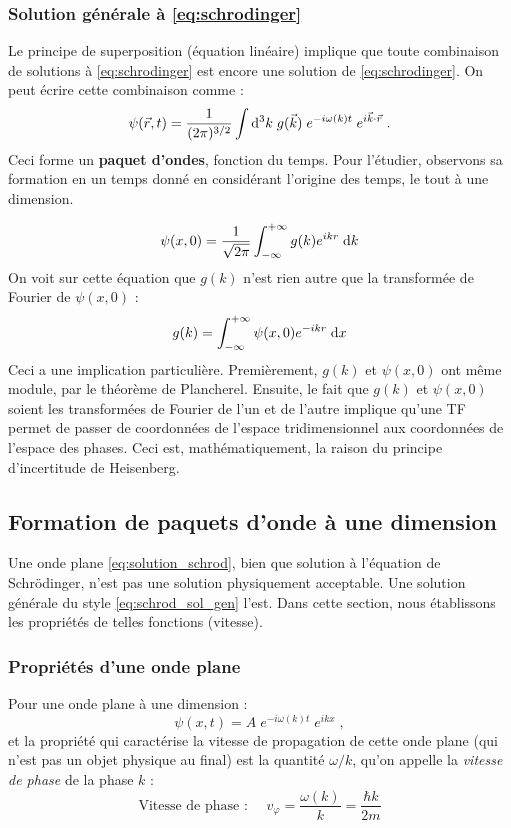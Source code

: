 \documentclass[12pt, a4paper]{book}
\begin{document}
\subsubsection{Solution générale à \eqref{eq:schrodinger}}
Le principe de superposition (équation linéaire) implique que toute combinaison de solutions à \eqref{eq:schrodinger} est encore une solution de \eqref{eq:schrodinger}. On peut écrire cette combinaison comme :
\begin{equation} \label{eq:schrod_sol_gen}
\psi(\vec r, t) = \dfrac{1}{(2\pi)^{3/2}} \int \mathrm{d} ^3 k \; g(\vec k) \; e^{-i\omega(k) t} \; e^{i\vec k \cdot \vec r} \; .
\end{equation}
Ceci forme un \textbf{paquet d'ondes}, fonction du temps. Pour l'étudier, observons sa formation en un temps donné en considérant l'origine des temps, le tout à une dimension.

$$\psi(x,0) = \dfrac{1}{\sqrt{2\pi}} \int_{-\infty} ^{+\infty} g(k) e^{ikr} \; \mathrm{d} k $$
On voit sur cette équation que $g(k)$ n'est rien autre que la transformée de Fourier de $\psi(x,0)$ :
$$g(k) = \int_{-\infty} ^{+\infty} \psi(x,0) e^{-ikr} \; \mathrm{d} x $$
Ceci a une implication particulière. Premièrement, $g(k)$ et $\psi(x,0)$ ont même module, par le théorème de Plancherel. Ensuite, le fait que $g(k)$ et $\psi(x,0)$ soient les transformées de Fourier de l'un et de l'autre implique qu'une TF permet de passer de coordonnées de l'espace tridimensionnel aux coordonnées de l'espace des phases. Ceci est, mathématiquement, la raison du principe d'incertitude de Heisenberg.


\subsection{Formation de paquets d'onde à une dimension}
Une onde plane \eqref{eq:solution_schrod}, bien que solution à l'équation de Schrödinger, n'est pas une solution physiquement acceptable. Une solution générale du style \eqref{eq:schrod_sol_gen} l'est. Dans cette section, nous établissons les propriétés de telles fonctions (vitesse).
\subsubsection{Propriétés d'une onde plane}
Pour une onde plane à une dimension :
$$\psi(x,t) = A \; e^{-i\omega(k) t} \; e ^{ikx} \; ,$$
et la propriété qui caractérise la vitesse de propagation de cette onde plane (qui n'est pas un objet physique au final) est la quantité $\omega/k$, qu'on appelle la \textit{vitesse de phase} de la phase $k$ :
\begin{equation}
\text{Vitesse de phase : } \quad v_\varphi = \dfrac{\omega(k)}{k} = \dfrac{\hbar k}{2m}
\end{equation}
\end{document}
